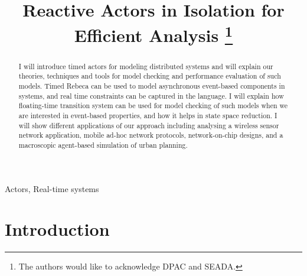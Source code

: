 \documentclass[conference]{IEEEtran}
\begin{document}
	
	\title{Reactive Actors in Isolation for Efficient Analysis 
		\thanks{The authors would like to acknowledge DPAC and SEADA.}
	}
	
	\author{
		\and
		\and
	}
	
	\maketitle
	
	\begin{abstract}
		I will introduce timed actors for modeling distributed systems and will explain our theories, techniques and tools for model checking and performance evaluation of such models. Timed Rebeca can be used to model asynchronous event-based components in systems, and real time constraints can be captured in the language. I will explain how floating-time transition system can be used for model checking of such models when we are interested in event-based properties, and how it helps in state space reduction. I will show different applications of our approach including analysing a wireless sensor network application, mobile ad-hoc network protocols, network-on-chip designs, and a macroscopic agent-based simulation of urban planning.
	\end{abstract}
	
	\begin{IEEEkeywords}
		Actors, Real-time systems\end{IEEEkeywords}
	
	\section{Introduction}
	
\end{document}
